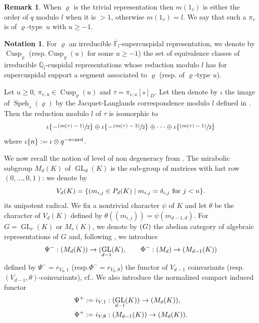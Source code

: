 \documentclass[11pt]{article}
\newcommand{\cf}{cf.\xspace}
\newcommand{\resp}{resp.\xspace}
\newcommand{\NoChangel}[1]{%
\expandafter\let\csname old\string#1\endcsname=#1
\let#1=\relax
\newcommand{#1}{\mathcode`l="716C\csname old\string#1\endcsname\mathcode`l="7160 }%
}
\let\sep\mid
\newcommand{\psfrac}[2]{\sfrac{(#1)}{#2}}
\DeclareMathOperator{\GL}{GL}
\theoremstyle{plain}
\theoremstyle{definition}
\newtheorem*{remark}{Remark}
\newtheorem{nota}[equation]{Notation}
\numberwithin{equation}{subsection}
\newcommand\Fm{{\mathbb F}}
\newcommand\Qm{{\mathbb Q}}
\DeclareMathOperator{\cusp}{Cusp}
\DeclareMathOperator{\speh}{Speh}
\DeclareMathOperator{\val}{val}\NoChangel{\val}
\DeclareMathOperator{\nrd}{nrd}
\DeclareMathOperator{\alg}{Alg}\NoChangel{\alg}
\begin{document}
\begin{remark}
When $\varrho$ is the trivial representation then $m(1_v)$ is either the order of $q$ modulo $l$
when it is $>1$, otherwise $m(1_v)=l$.
We say that such a $\pi_v$ is of $\varrho$-type~$u$ with $u \geq -1$.
\end{remark}


\begin{nota}
For $\varrho$ an irreducible $\overline \Fm_l$-supercuspidal representation, we denote by
$\cusp_\varrho$ (\resp $\cusp_\varrho(u)$ for some $u \geq -1$)
the set of equivalence classes of irreducible
$\overline \Qm_l$-cuspidal representations whose reduction modulo $l$ has
for supercuspidal
support a segment associated to $\varrho$ (\resp of $\varrho$-type $u$).
\end{nota}

Let $u \geq 0$, $\pi_{v,u} \in \cusp_{\varrho}(u)$ and $\tau=\pi_{v,u}[s]_{D}$. Let then denote
by $\iota$ the image of $\speh_s(\varrho)$ by the Jacquet-Langlands
correspondence modulo $l$
defined in \cite[\S 1.2.4]{dat-jl}. Then the reduction modulo $l$ of $\tau$ is isomorphic to
\begin{equation} \label{eq-red-tau}
\iota \{-\psfrac{m(\tau)-1}{2}\} \oplus \iota \{-\psfrac{m(\tau)-3}{2}\} \oplus \cdots \oplus \iota \{\psfrac{m(\tau)-1}{2}\}
\end{equation}
where $\iota \{n\}:=\iota \otimes q^{-n \val \circ \nrd}$.

We now recall the notion of level of non degeneracy from \cite[\S4]{zelevinski1}.
The mirabolic subgroup
$M_d(K)$ of $\GL_d(K)$ is the sub-group of matrices with last row $(0,\dots,0,1)$: we denote by
\[
V_d(K)=\{(m_{i,j} \in P_d(K)\sep m_{i,j}= \delta_{i,j} \hbox{ for } j < n\}.
\]
its unipotent radical. We fix a nontrivial character $\psi$ of $K$ and let $\theta$ be the
character of $V_d(K)$ defined by $\theta((m_{i,j}))=\psi(m_{d-1,d})$.
For $G=\GL_r(K)$ or $M_r(K)$, we denote by $\alg(G)$ the abelian category of algebraic
representations of $G$ and, following \cite{zelevinski1}, we introduce
\[
\Psi^-: \alg(M_d(K)) \to \alg(\GL_{d-1}(K), \qquad \Phi^-: \alg (M_d) \to
\alg (M_{d-1}(K))
\]
defined by $\Psi^-=r_{V_d,1}$ (\resp $\Phi^-=r_{V_d,\theta}$) the functor of $V_{d-1}$
coinvariants (resp.\ $(V_{d-1},\theta)$-coinvariants), \cf \cite[1.8]{zelevinski1}.
We also introduce the normalized compact induced functor
\begin{align*}
\Psi^+&:=i_{V,1}: \alg(\GL_{d-1}(K)) \to \alg (M_d(K)),
\\
\Phi^+&:=i_{V,\theta}: \alg(M_{d-1}(K)) \to \alg(M_d(K)).
\end{align*}
\end{document}
